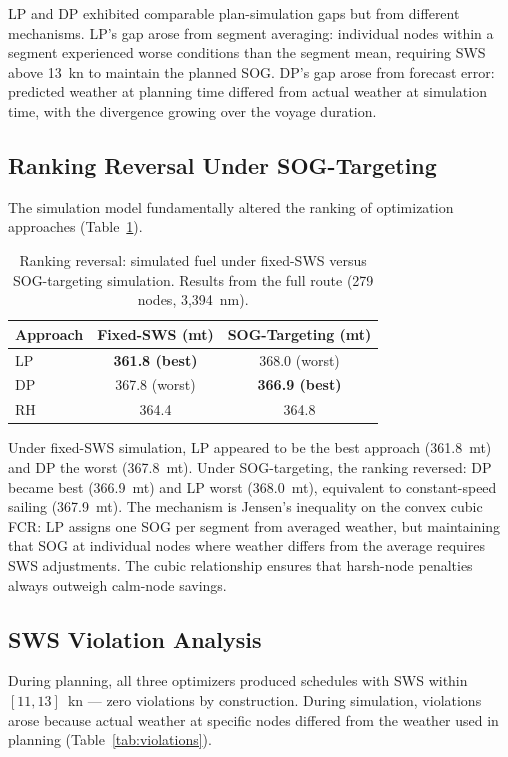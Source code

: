 \documentclass[review]{elsarticle}
\begin{document}
LP and DP exhibited comparable plan-simulation gaps but from different mechanisms. LP's gap arose from segment averaging: individual nodes within a segment experienced worse conditions than the segment mean, requiring SWS above 13~kn to maintain the planned SOG. DP's gap arose from forecast error: predicted weather at planning time differed from actual weather at simulation time, with the divergence growing over the voyage duration.

\subsection{Ranking Reversal Under SOG-Targeting}
\label{sec:results-reversal}

The simulation model fundamentally altered the ranking of optimization approaches (Table~\ref{tab:reversal}).

\begin{table}[htbp]
\centering
\caption{Ranking reversal: simulated fuel under fixed-SWS versus SOG-targeting simulation. Results from the full route (279 nodes, 3,394~nm).}
\label{tab:reversal}
\begin{tabular}{lcc}
\toprule
Approach & Fixed-SWS (mt) & SOG-Targeting (mt) \\
\midrule
LP & \textbf{361.8 (best)} & 368.0 (worst) \\
DP & 367.8 (worst) & \textbf{366.9 (best)} \\
RH & 364.4 & 364.8 \\
\bottomrule
\end{tabular}
\end{table}

Under fixed-SWS simulation, LP appeared to be the best approach (361.8~mt) and DP the worst (367.8~mt). Under SOG-targeting, the ranking reversed: DP became best (366.9~mt) and LP worst (368.0~mt), equivalent to constant-speed sailing (367.9~mt). The mechanism is Jensen's inequality on the convex cubic FCR: LP assigns one SOG per segment from averaged weather, but maintaining that SOG at individual nodes where weather differs from the average requires SWS adjustments. The cubic relationship ensures that harsh-node penalties always outweigh calm-node savings.

\subsection{SWS Violation Analysis}
\label{sec:results-violations}

During planning, all three optimizers produced schedules with SWS within $[11, 13]$~kn --- zero violations by construction. During simulation, violations arose because actual weather at specific nodes differed from the weather used in planning (Table~\ref{tab:violations}).
\end{document}
